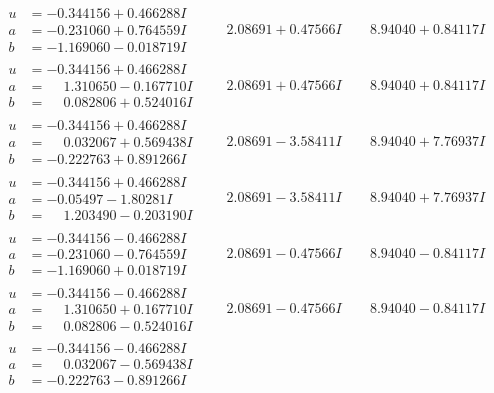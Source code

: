 \documentclass[1p]{elsarticle_modified}
\theoremstyle{definition}
\begin{document}
$$\begin{array}{c|c|c}
\begin{aligned}
u &= -0.344156 + 0.466288 I \\
a &= -0.231060 + 0.764559 I \\
b &= -1.169060 - 0.018719 I\end{aligned}
 & \phantom{-}2.08691 + 0.47566 I & \phantom{-}8.94040 + 0.84117 I \\ \hline\begin{aligned}
u &= -0.344156 + 0.466288 I \\
a &= \phantom{-}1.310650 - 0.167710 I \\
b &= \phantom{-}0.082806 + 0.524016 I\end{aligned}
 & \phantom{-}2.08691 + 0.47566 I & \phantom{-}8.94040 + 0.84117 I \\ \hline\begin{aligned}
u &= -0.344156 + 0.466288 I \\
a &= \phantom{-}0.032067 + 0.569438 I \\
b &= -0.222763 + 0.891266 I\end{aligned}
 & \phantom{-}2.08691 - 3.58411 I & \phantom{-}8.94040 + 7.76937 I \\ \hline\begin{aligned}
u &= -0.344156 + 0.466288 I \\
a &= -0.05497 - 1.80281 I \\
b &= \phantom{-}1.203490 - 0.203190 I\end{aligned}
 & \phantom{-}2.08691 - 3.58411 I & \phantom{-}8.94040 + 7.76937 I \\ \hline\begin{aligned}
u &= -0.344156 - 0.466288 I \\
a &= -0.231060 - 0.764559 I \\
b &= -1.169060 + 0.018719 I\end{aligned}
 & \phantom{-}2.08691 - 0.47566 I & \phantom{-}8.94040 - 0.84117 I \\ \hline\begin{aligned}
u &= -0.344156 - 0.466288 I \\
a &= \phantom{-}1.310650 + 0.167710 I \\
b &= \phantom{-}0.082806 - 0.524016 I\end{aligned}
 & \phantom{-}2.08691 - 0.47566 I & \phantom{-}8.94040 - 0.84117 I \\ \hline\begin{aligned}
u &= -0.344156 - 0.466288 I \\
a &= \phantom{-}0.032067 - 0.569438 I \\
b &= -0.222763 - 0.891266 I\end{aligned}

\end{array}$$
\end{document}
